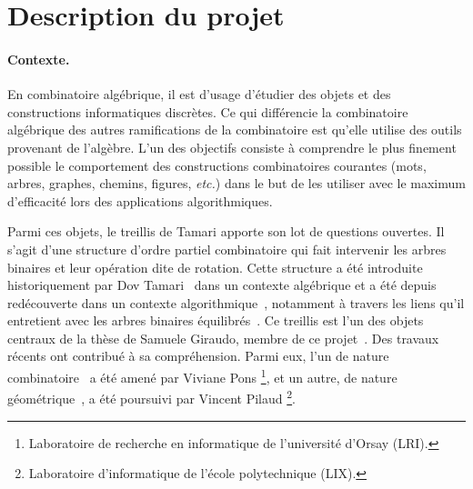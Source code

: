 \documentclass[a4paper, 10pt]{article}
\numberwithin{equation}{subsection}
\begin{document}
\section*{\center Description du projet}

\paragraph{Contexte.}
En combinatoire algébrique, il est d'usage d'étudier des objets et des
constructions informatiques discrètes.  Ce qui différencie la
combinatoire algébrique des autres ramifications de la combinatoire est
qu'elle utilise des outils provenant de l'algèbre. L'un des objectifs
consiste à  comprendre le plus finement possible le comportement des
constructions combinatoires courantes (mots, arbres, graphes, chemins,
figures, {\em etc.}) dans le but de les utiliser avec le maximum
d'efficacité lors des applications algorithmiques.
\smallbreak

Parmi ces objets, le treillis de Tamari apporte son lot de questions
ouvertes. Il s'agit d'une structure d'ordre partiel combinatoire qui
fait intervenir les arbres binaires et leur opération dite de rotation.
Cette structure a été introduite historiquement par Dov
Tamari~\cite{Tam62} dans un contexte algébrique et a été depuis
redécouverte dans un contexte algorithmique~\cite{Knu98}, notamment à
travers les liens qu'il entretient avec les arbres binaires
équilibrés~\cite{AVL62}. Ce treillis est l'un des objets centraux de la
thèse de Samuele Giraudo, membre de ce projet~\cite{Gir12}. Des travaux
récents ont contribué à sa compréhension. Parmi eux, l'un de nature
combinatoire~\cite{CP15} a été amené par Viviane Pons%
\footnote{Laboratoire de recherche en informatique de
l'université d'Orsay (LRI).},
et un autre, de nature géométrique~\cite{PS15}, a été poursuivi par
Vincent Pilaud%
\footnote{Laboratoire d'informatique de l'école polytechnique (LIX).}.
\smallbreak

\vspace{-.25cm}

\end{document}

